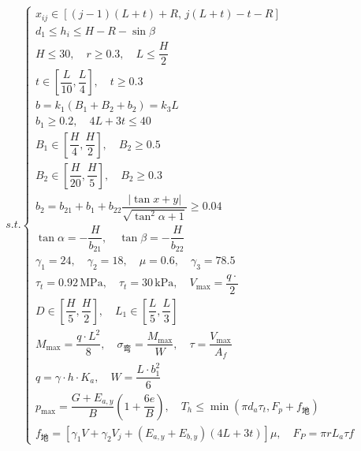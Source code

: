 \documentclass[withoutpreface,bwprint]{cumcmthesis}
\begin{document}
\begin{equation}s.t.
    \begin{cases}
        x_{ij} \in [(j-1)(L+t)+R, \, j(L+t)-t-R] \\[0.2cm]
        d_1 \le h_i \le H - R - \sin\beta \\[0.2cm]
        H \le 30, \quad r \ge 0.3, \quad L \le \dfrac{H}{2} \\[0.2cm]
        t \in \left[\dfrac{L}{10}, \dfrac{L}{4}\right], \quad t \ge 0.3 \\[0.2cm]
        b = k_{1}(B_{1} + B_{2} + b_{2}) = k_{3}L \\[0.2cm]
        b_{1} \ge 0.2, \quad 4L + 3t \le 40 \\[0.2cm]
        B_{1} \in \left[\dfrac{H}{4}, \dfrac{H}{2}\right], \quad B_{2} \ge 0.5 \\[0.2cm]
        B_{2} \in \left[\dfrac{H}{20}, \dfrac{H}{5}\right], \quad B_{2} \ge 0.3 \\[0.2cm]
        b_{2} = b_{21} + b_{1} + b_{22} \dfrac{| \tan x + y |}{\sqrt{\tan^2\alpha + 1}} \ge 0.04 \\[0.2cm]
        \tan\alpha = -\dfrac{H}{b_{21}}, \quad \tan\beta = -\dfrac{H}{b_{22}} \\[0.2cm]
        \gamma_1 = 24, \quad \gamma_2 = 18, \quad \mu = 0.6, \quad \gamma_3 = 78.5 \\[0.2cm]
        \tau_t = 0.92\,\text{MPa}, \quad \tau_t = 30\,\text{kPa}, \quad V_{\text{max}} = \dfrac{q \cdot}{2} \\[0.2cm]
        D \in \left[\dfrac{H}{5}, \dfrac{H}{2}\right], \quad L_1 \in \left[\dfrac{L}{5}, \dfrac{L}{3}\right] \\[0.2cm]
        M_{\text{max}} = \dfrac{q \cdot L^2}{8}, \quad \sigma_{\text{弯}} = \dfrac{M_{\text{max}}}{W}, \quad \tau = \dfrac{V_{\text{max}}}{A_f} \\[0.2cm]
        q = \gamma \cdot h \cdot K_a, \quad W = \dfrac{L \cdot b_1^2}{6} \\[0.2cm]
        p_{\text{max}} = \dfrac{G + E_{a,y}}{B} \left(1 + \dfrac{6e}{B}\right), \quad T_h \le \min(\pi d_a\tau_t, F_p + f_{\text{地}}) \\[0.2cm]
        f_{\text{地}} = [\gamma_1 V + \gamma_2 V_j + (E_{a,y} + E_{b,y})(4L + 3t)]\mu, \quad F_P = \pi r L_a \tau f
    \end{cases}
\end{equation}
\end{document}
